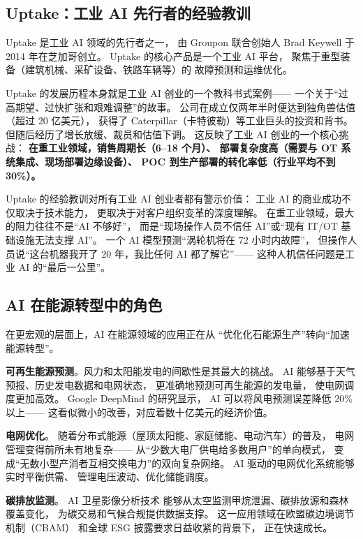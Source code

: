 \subsection{Uptake：工业 AI 先行者的经验教训}

Uptake 是工业 AI 领域的先行者之一，
由 Groupon 联合创始人 Brad Keywell 于 2014 年在芝加哥创立。
Uptake 的核心产品是一个工业 AI 平台，
聚焦于重型装备（建筑机械、采矿设备、铁路车辆等）的
故障预测和运维优化。

Uptake 的发展历程本身就是工业 AI 创业的一个教科书式案例——
一个关于``过高期望、过快扩张和艰难调整''的故事。
公司在成立仅两年半时便达到独角兽估值（超过 20 亿美元），
获得了 Caterpillar（卡特彼勒）等工业巨头的投资和背书。
但随后经历了增长放缓、裁员和估值下调。
这反映了工业 AI 创业的一个核心挑战：
\textbf{在重工业领域，销售周期长（6--18 个月）、
部署复杂度高（需要与 OT 系统集成、现场部署边缘设备）、
POC 到生产部署的转化率低（行业平均不到 30\%）。}

Uptake 的经验教训对所有工业 AI 创业者都有警示价值：
工业 AI 的商业成功不仅取决于技术能力，
更取决于对客户组织变革的深度理解。
在重工业领域，最大的阻力往往不是``AI 不够好''，
而是``现场操作人员不信任 AI''或``现有 IT/OT 基础设施无法支撑 AI''。
一个 AI 模型预测``涡轮机将在 72 小时内故障''，
但操作人员说``这台机器我开了 20 年，我比任何 AI 都了解它''——
这种人机信任问题是工业 AI 的``最后一公里''。

\subsection{AI 在能源转型中的角色}

在更宏观的层面上，AI 在能源领域的应用正在从
``优化化石能源生产''转向``加速能源转型''。

\textbf{可再生能源预测}。风力和太阳能发电的间歇性是其最大的挑战。
AI 能够基于天气预报、历史发电数据和电网状态，
更准确地预测可再生能源的发电量，
使电网调度更加高效。
Google DeepMind 的研究显示，
AI 可以将风电预测误差降低 20\% 以上——
这看似微小的改善，对应着数十亿美元的经济价值。

\textbf{电网优化}。
随着分布式能源（屋顶太阳能、家庭储能、电动汽车）的普及，
电网管理变得前所未有地复杂——
从``少数大电厂供电给多数用户''的单向模式，
变成``无数小型产消者互相交换电力''的双向复杂网络。
AI 驱动的电网优化系统能够实时平衡供需、
管理电压波动、优化储能调度。

\textbf{碳排放监测}。
AI 卫星影像分析技术
能够从太空监测甲烷泄漏、碳排放源和森林覆盖变化，
为碳交易和气候合规提供数据支撑。
这一应用领域在欧盟碳边境调节机制（CBAM）
和全球 ESG 披露要求日益收紧的背景下，
正在快速成长。

